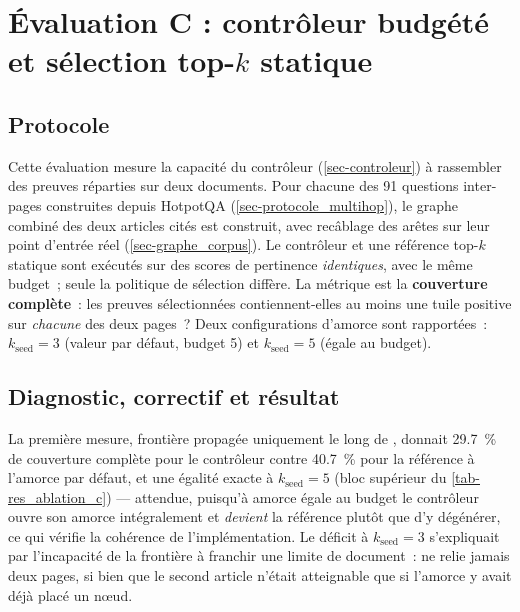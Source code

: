 \section{Évaluation C : contrôleur budgété et sélection top-\texorpdfstring{$k$}{k} statique}
\label{sec-res_ablation_c}

\subsection{Protocole}

Cette évaluation mesure la capacité du contrôleur (\cref{sec-controleur}) à
rassembler des preuves réparties sur deux documents. Pour chacune des
\num{91} questions inter-pages construites depuis HotpotQA
(\cref{sec-protocole_multihop}), le graphe combiné des deux articles cités
est construit, avec recâblage des arêtes  sur leur point
d'entrée réel (\cref{sec-graphe_corpus}). Le contrôleur et une référence
top-$k$ statique sont exécutés sur des scores de pertinence
\emph{identiques}, avec le même budget~; seule la politique de sélection
diffère. La métrique est la \textbf{couverture complète}~: les preuves
sélectionnées contiennent-elles au moins une tuile positive sur
\emph{chacune} des deux pages~? Deux configurations d'amorce sont
rapportées~: $k_{\text{seed}} = 3$ (valeur par défaut, budget \num{5}) et
$k_{\text{seed}} = 5$ (égale au budget).

\subsection{Diagnostic, correctif et résultat}
\label{sec-res_c_avant}

La première mesure, frontière propagée uniquement le long de
, donnait \SI{29.7}{\percent} de couverture complète pour
le contrôleur contre \SI{40.7}{\percent} pour la référence à l'amorce par
défaut, et une égalité exacte à $k_{\text{seed}} = 5$ (bloc supérieur du \cref{tab-res_ablation_c}) --- attendue, puisqu'à amorce égale au budget le
contrôleur ouvre son amorce intégralement et \emph{devient} la référence
plutôt que d'y dégénérer, ce qui vérifie la cohérence de l'implémentation.
Le déficit à $k_{\text{seed}} = 3$ s'expliquait par l'incapacité de la
frontière à franchir une limite de document~:  ne relie
jamais deux pages, si bien que le second article n'était atteignable que si
l'amorce y avait déjà placé un nœud.

